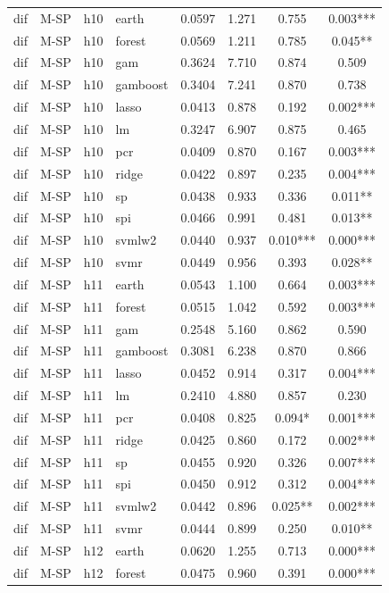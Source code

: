 \begin{ThreePartTable}
\begin{longtable}[t]{llclcccc}
\addlinespace
dif & M-SP & h10 & earth & 0.0597 & 1.271 & 0.755 & 0.003***\\
dif & M-SP & h10 & forest & 0.0569 & 1.211 & 0.785 & 0.045**\\
dif & M-SP & h10 & gam & 0.3624 & 7.710 & 0.874 & 0.509\\
dif & M-SP & h10 & gamboost & 0.3404 & 7.241 & 0.870 & 0.738\\
dif & M-SP & h10 & lasso & 0.0413 & 0.878 & 0.192 & 0.002***\\
dif & M-SP & h10 & lm & 0.3247 & 6.907 & 0.875 & 0.465\\
dif & M-SP & h10 & pcr & 0.0409 & 0.870 & 0.167 & 0.003***\\
dif & M-SP & h10 & ridge & 0.0422 & 0.897 & 0.235 & 0.004***\\
dif & M-SP & h10 & sp & 0.0438 & 0.933 & 0.336 & 0.011**\\
dif & M-SP & h10 & spi & 0.0466 & 0.991 & 0.481 & 0.013**\\
dif & M-SP & h10 & svmlw2 & 0.0440 & 0.937 & 0.010*** & 0.000***\\
dif & M-SP & h10 & svmr & 0.0449 & 0.956 & 0.393 & 0.028**\\
\addlinespace
dif & M-SP & h11 & earth & 0.0543 & 1.100 & 0.664 & 0.003***\\
dif & M-SP & h11 & forest & 0.0515 & 1.042 & 0.592 & 0.003***\\
dif & M-SP & h11 & gam & 0.2548 & 5.160 & 0.862 & 0.590\\
dif & M-SP & h11 & gamboost & 0.3081 & 6.238 & 0.870 & 0.866\\
dif & M-SP & h11 & lasso & 0.0452 & 0.914 & 0.317 & 0.004***\\
dif & M-SP & h11 & lm & 0.2410 & 4.880 & 0.857 & 0.230\\
dif & M-SP & h11 & pcr & 0.0408 & 0.825 & 0.094* & 0.001***\\
dif & M-SP & h11 & ridge & 0.0425 & 0.860 & 0.172 & 0.002***\\
dif & M-SP & h11 & sp & 0.0455 & 0.920 & 0.326 & 0.007***\\
dif & M-SP & h11 & spi & 0.0450 & 0.912 & 0.312 & 0.004***\\
dif & M-SP & h11 & svmlw2 & 0.0442 & 0.896 & 0.025** & 0.002***\\
dif & M-SP & h11 & svmr & 0.0444 & 0.899 & 0.250 & 0.010**\\
\addlinespace
dif & M-SP & h12 & earth & 0.0620 & 1.255 & 0.713 & 0.000***\\
dif & M-SP & h12 & forest & 0.0475 & 0.960 & 0.391 & 0.000***\\

\end{longtable}
\end{ThreePartTable}
